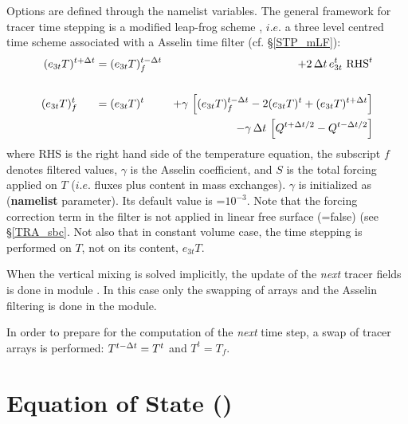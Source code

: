 Options are defined through the   namelist variables.
The general framework for tracer time stepping is a modified leap-frog scheme 
\citep{Leclair_Madec_OM09}, $i.e.$ a three level centred time scheme associated 
with a Asselin time filter (cf. \S\ref{STP_mLF}):
\begin{equation} \label{Eq_tra_nxt}
\begin{aligned}
(e_{3t}T)^{t+\Delta t} &= (e_{3t}T)_f^{t-\Delta t} &+ 2 \, \Delta t  \,e_{3t}^t\ \text{RHS}^t &	\\
\\
(e_{3t}T)_f^t  \;\ \quad &= (e_{3t}T)^t \;\quad 
                                    &+\gamma \,\left[ {(e_{3t}T)_f^{t-\Delta t} -2(e_{3t}T)^t+(e_{3t}T)^{t+\Delta t}} \right] &  \\
                                 & &- \gamma\,\Delta t \, \left[ Q^{t+\Delta t/2} -  Q^{t-\Delta t/2} \right]  &                      
\end{aligned}
\end{equation} 
where RHS is the right hand side of the temperature equation, 
the subscript $f$ denotes filtered values, $\gamma$ is the Asselin coefficient,
and $S$ is the total forcing applied on $T$ ($i.e.$ fluxes plus content in mass exchanges). 
$\gamma$ is initialized as  (\textbf{namelist} parameter). 
Its default value is =$10^{-3}$. Note that the forcing correction term in the filter
is not applied in linear free surface (=false) (see \S\ref{TRA_sbc}.
Not also that in constant volume case, the time stepping is performed on $T$, 
not on its content, $e_{3t}T$.

When the vertical mixing is solved implicitly, the update of the \textit{next} tracer 
fields is done in module . In this case only the swapping of arrays 
and the Asselin filtering is done in the  module.

In order to prepare for the computation of the \textit{next} time step, 
a swap of tracer arrays is performed: $T^{t-\Delta t} = T^t$ and $T^t = T_f$. 

\section  [Equation of State (\textit{eosbn2}) ]
		{Equation of State () }
\label{TRA_eosbn2}

